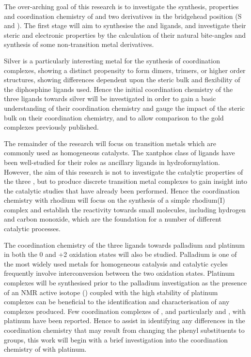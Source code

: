 The over-arching goal of this research is to investigate the synthesis, properties and coordination chemistry of \tBuxantphos{} and two derivatives in the bridgehead position (S and ).  The first stage will aim to synthesise the \tButhixantphos{} and \tBusixantphos{} ligands, and investigate their steric and electronic properties by the calculation of their natural bite-angles and synthesis of some non-transition metal derivatives.  

Silver is a particularly interesting metal for the synthesis of coordination complexes, showing a distinct propensity to form dimers, trimers, or higher order structures, showing differences dependent upon the steric bulk and flexibility of the diphosphine ligands used.\cite{Meijboom2009}  Hence the initial coordination chemistry of the three \tBuxantphos{} ligands towards silver will be investigated in order to gain a basic understanding of their coordination chemistry and gauge the impact of the steric bulk on their coordination chemistry, and to allow comparison to the gold \tBuxantphos{} complexes previously published.

The remainder of the research will focus on transition metals which are commonly used as homogeneous catalysts.  The xantphos class of ligands have been well-studied for their roles as ancillary ligands in hydroformylation.  However, the aim of this research is not to investigate the catalytic properties of the three \tBuxantphos{}, but to produce discrete transition metal complexes to gain insight into the catalytic studies that have already been performed.  Hence the coordination chemistry with rhodium will focus on the synthesis of a simple rhodium(I) complex and establish the reactivity towards small molecules, including hydrogen and carbon monoxide, which are the foundation for a number of different catalytic processes.  

The coordination chemistry of the three \tBuxantphos{} ligands towards palladium and platinum in both the 0 and +2 oxidation states will also be studied.  Palladium is one of the most widely used metals for homogeneous catalysis and catalytic cycles frequently involve interconversion between the two oxidation states.  Platinum complexes will be synthesised prior to the palladium investigation as the presence of an NMR active isotope (\Pt) coupled with the high stability of platinum complexes can be beneficial to the identification and characterisation of any complexes produced.  Few coordination complexes of \Phxantphos{}, and particularly \Phthixantphos{} and \Phsixantphos{}, with platinum have been reported.  Hence to assist in identifying any differences in the coordination chemistry that may result from changing the phenyl substituents to \tBu{} groups, this work will begin with a brief investigation into the coordination chemistry of \Phthixantphos{} with platinum.  

